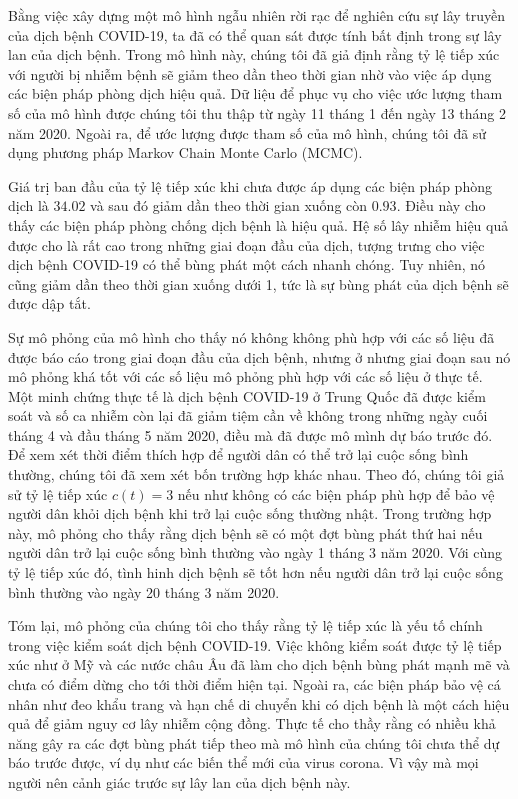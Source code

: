 \documentclass[../main.tex]{subfiles}
\begin{document}
Bằng việc xây dựng một mô hình ngẫu nhiên rời rạc để nghiên cứu sự lây truyền của dịch bệnh COVID-19, ta đã có thể quan sát được tính bất định trong sự lây lan của dịch bệnh. Trong mô hình này, chúng tôi đã giả định rằng tỷ lệ tiếp xúc với người bị nhiễm bệnh sẽ giảm theo dần theo thời gian nhờ vào việc áp dụng các biện pháp phòng dịch hiệu quả. Dữ liệu để phục vụ cho việc ước lượng tham số của mô hình được chúng tôi thu thập từ ngày 11 tháng 1 đến ngày 13 tháng 2 năm 2020. Ngoài ra, để ước lượng được tham số của mô hình, chúng tôi đã sử dụng phương pháp Markov Chain Monte Carlo (MCMC).

Giá trị ban đầu của tỷ lệ tiếp xúc khi chưa được áp dụng các biện pháp phòng dịch là $34.02$ và sau đó giảm dần theo thời gian xuống còn $0.93$. Điều này cho thấy các biện pháp phòng chống dịch bệnh là hiệu quả. Hệ số lây nhiễm hiệu quả được cho là rất cao trong những giai đoạn đầu của dịch, tượng trưng cho việc dịch bệnh COVID-19 có thể bùng phát một cách nhanh chóng. Tuy nhiên, nó cũng giảm dần theo thời gian xuống dưới 1, tức là sự bùng phát của dịch bệnh sẽ được dập tắt.

Sự mô phỏng của mô hình cho thấy nó không không phù hợp với các số liệu đã được báo cáo trong giai đoạn đầu của dịch bệnh, nhưng ở nhưng giai đoạn sau nó mô phỏng khá tốt với các số liệu mô phỏng phù hợp với các số liệu ở thực tế. Một minh chứng thực tế là dịch bệnh COVID-19 ở Trung Quốc đã được kiểm soát và số ca nhiễm còn lại đã giảm tiệm cần về không trong những ngày cuối tháng 4 và đầu tháng 5 năm 2020, điều mà đã được mô mình dự báo trước đó. Để xem xét thời điểm thích hợp để người dân có thể trở lại cuộc sống bình thường, chúng tôi đã xem xét bốn trường hợp khác nhau. Theo đó, chúng tôi giả sử tỷ lệ tiếp xúc $c(t)=3$ nếu như không có các biện pháp phù hợp để bảo vệ người dân khỏi dịch bệnh khi trở lại cuộc sống thường nhật. Trong trường hợp này, mô phỏng cho thấy rằng dịch bệnh sẽ có một đợt bùng phát thứ hai nếu người dân trở lại cuộc sống bình thường vào ngày 1 tháng 3 năm 2020. Với cùng tỷ lệ tiếp xúc đó, tình hinh dịch bệnh sẽ tốt hơn nếu người dân trở lại cuộc sống bình thường vào ngày 20 tháng 3 năm 2020.

Tóm lại, mô phỏng của chúng tôi cho thấy rằng tỷ lệ tiếp xúc là yếu tố chính trong việc kiểm soát dịch bệnh COVID-19. Việc không kiểm soát được tỷ lệ tiếp xúc như ở Mỹ và các nước châu Âu đã làm cho dịch bệnh bùng phát mạnh mẽ và chưa có điểm dừng cho tới thời điểm hiện tại. Ngoài ra, các biện pháp bảo vệ cá nhân như đeo khẩu trang và hạn chế di chuyển khi có dịch bệnh là một cách hiệu quả để giảm nguy cơ lây nhiễm cộng đồng. Thực tế cho thầy rằng có nhiều khả năng gây ra các đợt bùng phát tiếp theo mà mô hình của chúng tôi chưa thể dự báo trước được, ví dụ như các biến thể mới của virus corona. Vì vậy mà mọi người nên cảnh giác trước sự lây lan của dịch bệnh này.
\end{document}
